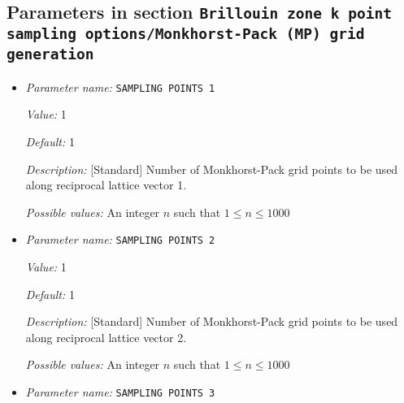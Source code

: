 \subsection{Parameters in section \tt Brillouin zone k point sampling options/Monkhorst-Pack (MP) grid generation}
\label{parameters:Brillouin_20zone_20k_20point_20sampling_20options/Monkhorst_2dPack_20_28MP_29_20grid_20generation}

\begin{itemize}
\item {\it Parameter name:} {\tt SAMPLING POINTS 1}
\label{parameters:Brillouin zone k point sampling options/Monkhorst_2dPack _28MP_29 grid generation/SAMPLING POINTS 1}
\label{parameters:Brillouin_20zone_20k_20point_20sampling_20options/Monkhorst_2dPack_20_28MP_29_20grid_20generation/SAMPLING_20POINTS_201}


{\it Value:} 1


{\it Default:} 1


{\it Description:} [Standard] Number of Monkhorst-Pack grid points to be used along reciprocal lattice vector 1.


{\it Possible values:} An integer $n$ such that $1\leq n \leq 1000$
\item {\it Parameter name:} {\tt SAMPLING POINTS 2}
\label{parameters:Brillouin zone k point sampling options/Monkhorst_2dPack _28MP_29 grid generation/SAMPLING POINTS 2}
\label{parameters:Brillouin_20zone_20k_20point_20sampling_20options/Monkhorst_2dPack_20_28MP_29_20grid_20generation/SAMPLING_20POINTS_202}


{\it Value:} 1


{\it Default:} 1


{\it Description:} [Standard] Number of Monkhorst-Pack grid points to be used along reciprocal lattice vector 2.


{\it Possible values:} An integer $n$ such that $1\leq n \leq 1000$
\item {\it Parameter name:} {\tt SAMPLING POINTS 3}
\label{parameters:Brillouin zone k point sampling options/Monkhorst_2dPack _28MP_29 grid generation/SAMPLING POINTS 3}
\label{parameters:Brillouin_20zone_20k_20point_20sampling_20options/Monkhorst_2dPack_20_28MP_29_20grid_20generation/SAMPLING_20POINTS_203}



\end{itemize}
